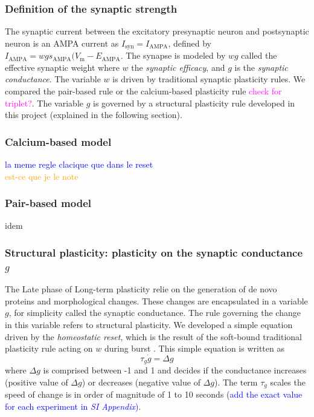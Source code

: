 \subsubsection{Definition of the synaptic strength}
The synaptic current between the excitatory presynaptic neuron and postsynaptic neuron is an AMPA current as $I_\mathrm{syn} = I_\mathrm{AMPA}$, defined by $I_\mathrm{AMPA} = wg s_\mathrm{AMPA}(V_\mathrm{m}-E_\mathrm{AMPA}$. The synapse is modeled by $wg$ called the effective synaptic weight where $w$ the  \textit{synaptic efficacy}, and $g$ is the \textit{synaptic conductance}. The variable $w$ is driven by traditional synaptic plasticity rules. We compared the pair-based rule \citep{abbott_synaptic_2000} or the calcium-based plasticity rule \citep{graupner_natural_2016} \textcolor{magenta}{check for triplet?}. The variable $g$ is governed by a structural plasticity rule developed in this project (explained in the following section).

\subsubsection{Calcium-based model}
\textcolor{blue}{la meme regle clacique que dans le reset}\\
\textcolor{orange}{est-ce que je le note}
\subsubsection{Pair-based model}
idem


\subsubsection{Structural plasticity: plasticity on the synaptic conductance $g$}

The Late phase of Long-term plasticity relie on the generation of de novo proteins and morphological changes. These changes are encapsulated in a variable $g$, for simplicity called the synaptic conductance. The rule governing the change in this variable refers to structural plasticity. We developed a simple equation driven by the \textit{ homeostatic reset}, which is the result of the soft-bound traditional plasticity rule acting on $w$ during burst \citep{jacquerie_switches_2022}.  
This simple equation is written as
$$ \tau_g \dot{g} = \Delta g $$
where $\Delta g$ is comprised between -1 and 1 and decides if the conductance increases (positive value of $\Delta g$) or decreases (negative value of $\Delta g$). The term $\tau_g$ scales the speed of change is in order of magnitude of 1 to 10 seconds (\textcolor{blue}{add the exact value for each experiment in \textit{SI Appendix})}.


